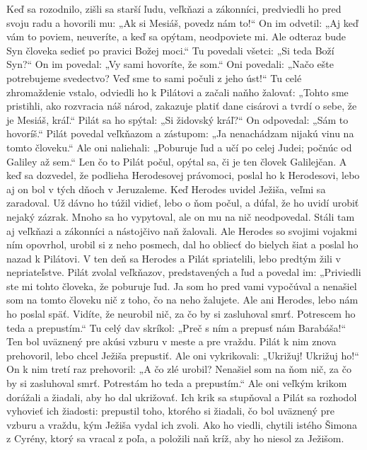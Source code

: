 Keď sa rozodnilo, zišli sa starší ľudu, veľkňazi a zákonníci, predviedli ho pred svoju radu a hovorili mu: „Ak si Mesiáš, povedz nám to!“ On im odvetil: „Aj keď vám to poviem, neuveríte, a keď sa opýtam, neodpoviete mi. 
Ale odteraz bude Syn človeka sedieť po pravici Božej moci.“ Tu povedali všetci: „Si teda Boží Syn?“ On im povedal: „Vy sami hovoríte, že som.“ Oni povedali: „Načo ešte potrebujeme svedectvo? Veď sme to sami počuli z jeho úst!“
\versseparator
Tu celé zhromaždenie vstalo, odviedli ho k Pilátovi a začali naňho žalovať: „Tohto sme pristihli, ako rozvracia náš národ, zakazuje platiť dane cisárovi a tvrdí o sebe, že je Mesiáš, kráľ.“ Pilát sa ho spýtal: „Si židovský kráľ?“ On odpovedal: „Sám to hovoríš.“ Pilát povedal veľkňazom a zástupom: „Ja nenachádzam nijakú vinu na tomto človeku.“ Ale oni naliehali: „Poburuje ľud a učí po celej Judei; počnúc od Galiley až sem.“
\versseparator
Len čo to Pilát počul, opýtal sa, či je ten človek Galilejčan. 
A keď sa dozvedel, že podlieha Herodesovej právomoci, poslal ho k Herodesovi, lebo aj on bol v tých dňoch v Jeruzaleme. Keď Herodes uvidel Ježiša, veľmi sa zaradoval. Už dávno ho túžil vidieť, lebo o ňom počul, a dúfal, že ho uvidí urobiť nejaký zázrak. Mnoho sa ho vypytoval, ale on mu na nič neodpovedal. Stáli tam aj veľkňazi a zákonníci a nástojčivo naň žalovali. Ale Herodes so svojimi vojakmi ním opovrhol, urobil si z neho posmech, dal ho obliecť do bielych šiat a poslal ho nazad k Pilátovi. V ten deň sa Herodes a Pilát spriatelili, lebo predtým žili v nepriateľstve.
\versseparator
Pilát zvolal veľkňazov, predstavených a ľud a povedal im: „Priviedli ste mi tohto človeka, že poburuje ľud. Ja som ho pred vami vypočúval a nenašiel som na tomto človeku nič z toho, čo na neho žalujete. Ale ani Herodes, lebo nám ho poslal späť. Vidíte, že neurobil nič, za čo by si zasluhoval smrť. Potrescem ho teda a prepustím.“
Tu celý dav skríkol: „Preč s ním a prepusť nám Barabáša!“ Ten bol uväznený pre akúsi vzburu v meste a pre vraždu.
Pilát k nim znova prehovoril, lebo chcel Ježiša prepustiť. Ale oni vykrikovali: „Ukrižuj! Ukrižuj ho!“ On k nim tretí raz prehovoril: „A čo zlé urobil? Nenašiel som na ňom nič, za čo by si zasluhoval smrť. Potrestám ho teda a prepustím.“ Ale oni veľkým krikom dorážali a žiadali, aby ho dal ukrižovať. Ich krik sa stupňoval a Pilát sa rozhodol vyhovieť ich žiadosti: prepustil toho, ktorého si žiadali, čo bol uväznený pre vzburu a vraždu, kým Ježiša vydal ich zvoli.
\versseparator
Ako ho viedli, chytili istého Šimona z Cyrény, ktorý sa vracal z poľa, a položili naň kríž, aby ho niesol za Ježišom.
